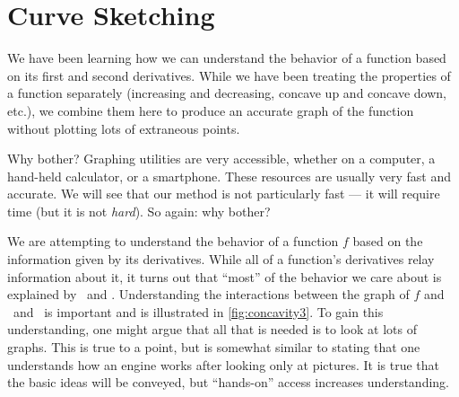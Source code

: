 \section{Curve Sketching}\label{sec:sketch}

We have been learning how we can understand the behavior of a function based on its first and second derivatives. While we have been treating the properties of a function separately (increasing and decreasing, concave up and concave down, etc.), we combine them here to produce an accurate graph of the function without plotting lots of extraneous points.

Why bother? Graphing utilities are very accessible, whether on a computer, a hand-held calculator, or a smartphone. These resources are usually very fast and accurate. We will see that our method is not particularly fast --- it will require time (but it is not \emph{hard}). So again: why bother?


We are attempting to understand the behavior of a function $f$ based on the information given by its derivatives. While all of a function's derivatives relay information about it, it turns out that ``most'' of the behavior we care about is explained by \fp\ and \fpp. Understanding the interactions between the graph of $f$ and \fp\ and \fpp\ is important and is illustrated in \autoref{fig:concavity3}. To gain this understanding, one might argue that all that is needed is to look at lots of graphs. This is true to a point, but is somewhat similar to stating that one understands how an engine works after looking only at pictures. It is true that the basic ideas will be conveyed, but ``hands-on'' access increases understanding.

